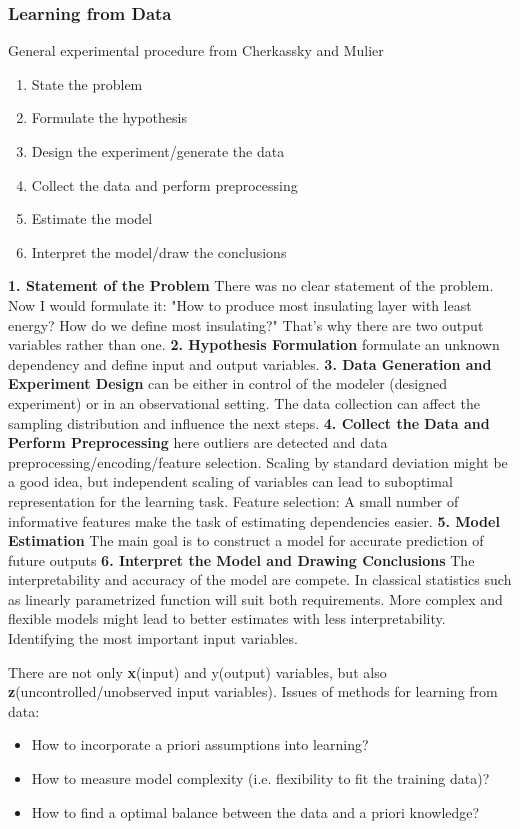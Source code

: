 \subsubsection{Learning from Data}
General experimental procedure from Cherkassky and Mulier\cite{cherkassky1998learning}
\begin{enumerate}
	\item State the problem 
	\item Formulate the hypothesis
	\item Design the experiment/generate the data
	\item Collect the data and perform preprocessing
	\item Estimate the model 
	\item Interpret the model/draw the conclusions
\end{enumerate}
\textbf{1. Statement of the Problem} There was no clear statement of the problem. Now I would formulate it: "How to produce most insulating layer with least energy? How do we define most insulating?" That's why there are two output variables rather than one.
\textbf{2. Hypothesis Formulation} formulate an unknown dependency and define input and output variables.
\textbf{3. Data Generation and Experiment Design} can be either in control of the modeler (designed experiment) or in an observational setting. The data collection can affect the sampling distribution and influence the next steps. 
\textbf{4. Collect the Data and Perform Preprocessing} here outliers are detected and data preprocessing/encoding/feature selection. Scaling by standard deviation might be a good idea, but independent scaling of variables can lead to suboptimal representation for the learning task. Feature selection: A small number of informative features make the task of estimating dependencies easier. 
\textbf{5. Model Estimation} The main goal is to construct a model for accurate prediction of future outputs
\textbf{6. Interpret the Model and Drawing Conclusions} The interpretability and accuracy of the model are compete. In classical statistics such as linearly parametrized function will suit both requirements. More complex and flexible models might lead to better estimates with less interpretability. Identifying the most important input variables. \cite{cherkassky1998learning}

There are not only \textbf{x}(input) and y(output) variables, but also \textbf{z}(uncontrolled/unobserved input variables).
Issues of methods for learning from data: 
\begin{itemize}
	\item How to incorporate a priori assumptions into learning? 
	\item How to measure model complexity (i.e. flexibility to fit the training data)?
	\item How to find a optimal balance between the data and a priori knowledge? 
\end{itemize}
\cite{cherkassky1998learning}

